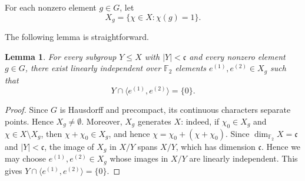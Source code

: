 \documentclass[12pt]{amsart}
\newtheorem{lemma}[theorem]{Lemma}
\theoremstyle{definition}
\numberwithin{equation}{section}
\theoremstyle{remark}
\begin{document}
For each nonzero element $g\in G$, let
\[
X_g=\{\chi\in X:\chi(g)=1\}.
\]

The following lemma is straightforward.

\begin{lemma}\label{Le1}
For every subgroup $Y\le X$ with $|Y|<\mathfrak c$ and every nonzero element $g\in G$, there exist linearly independent over $\mathbb{F}_2$ elements $e^{(1)},e^{(2)}\in X_g$ such that
\[
Y\cap\langle e^{(1)},e^{(2)}\rangle=\{0\}.
\]
\end{lemma}

\begin{proof}
Since $G$ is Hausdorff and precompact, its continuous characters separate points. Hence $X_g\neq\emptyset$. Moreover, $X_g$ generates $X$: indeed, if $\chi_0\in X_g$ and $\chi\in X\setminus X_g$, then $\chi+\chi_0\in X_g$, and hence $\chi=\chi_0+(\chi+\chi_0)$. Since $\dim_{\mathbb F_2}X=\mathfrak c$ and $|Y|<\mathfrak c$, the
image of $X_g$ in $X/Y$ spans $X/Y$, which has dimension
$\mathfrak c$. Hence we may choose $e^{(1)},e^{(2)}\in X_g$ whose images in $X/Y$ are linearly independent. This gives $Y\cap\langle e^{(1)},e^{(2)}\rangle=\{0\}$.
\end{proof}
\end{document}
